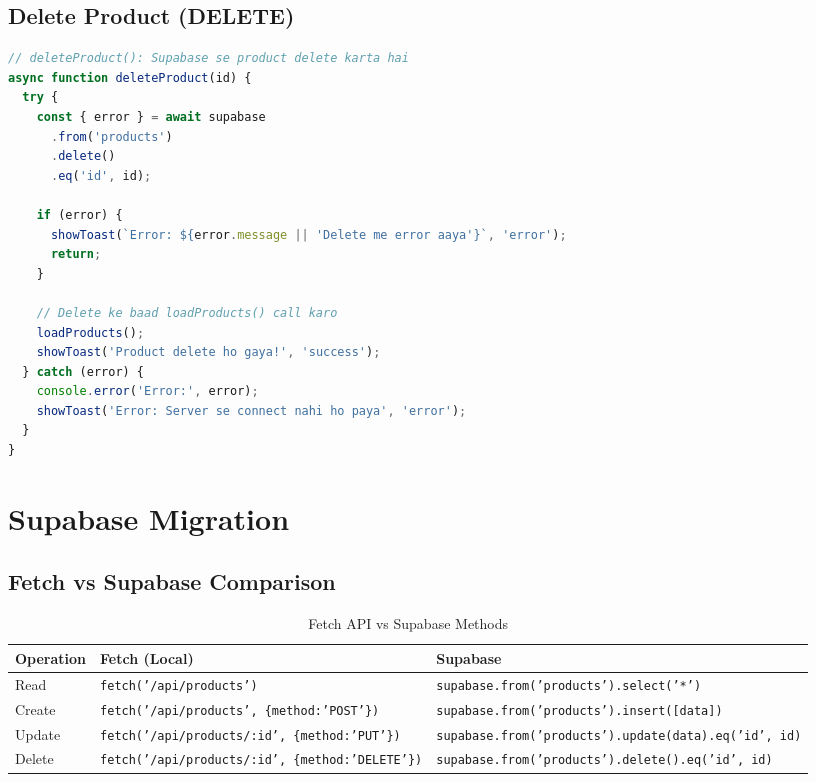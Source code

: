 \documentclass[12pt,a4paper]{article}
\begin{document}
\subsection{Delete Product (DELETE)}
\begin{lstlisting}[language=JavaScript, caption={deleteProduct() - Supabase Delete}]
// deleteProduct(): Supabase se product delete karta hai
async function deleteProduct(id) {
  try {
    const { error } = await supabase
      .from('products')
      .delete()
      .eq('id', id);

    if (error) {
      showToast(`Error: ${error.message || 'Delete me error aaya'}`, 'error');
      return;
    }

    // Delete ke baad loadProducts() call karo
    loadProducts();
    showToast('Product delete ho gaya!', 'success');
  } catch (error) {
    console.error('Error:', error);
    showToast('Error: Server se connect nahi ho paya', 'error');
  }
}
\end{lstlisting}

\section{Supabase Migration}
\label{sec:supabase}

\subsection{Fetch vs Supabase Comparison}
\begin{table}[H]
\centering
\caption{Fetch API vs Supabase Methods}
\begin{tabular}{@{}lll@{}}
\toprule
\textbf{Operation} & \textbf{Fetch (Local)} & \textbf{Supabase} \\
\midrule
Read & \texttt{fetch('/api/products')} & \texttt{supabase.from('products').select('*')} \\
Create & \texttt{fetch('/api/products', \{method:'POST'\})} & \texttt{supabase.from('products').insert([data])} \\
Update & \texttt{fetch('/api/products/:id', \{method:'PUT'\})} & \texttt{supabase.from('products').update(data).eq('id', id)} \\
Delete & \texttt{fetch('/api/products/:id', \{method:'DELETE'\})} & \texttt{supabase.from('products').delete().eq('id', id)} \\
\bottomrule
\end{tabular}
\end{table}
\end{document}
